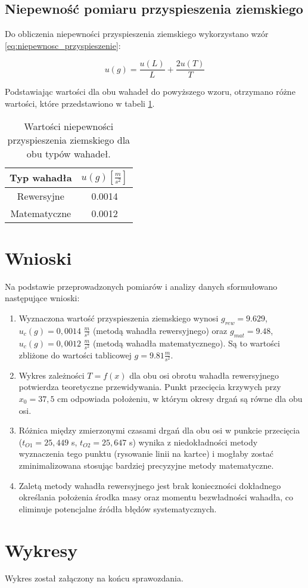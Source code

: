 \documentclass[a4paper,12pt]{article}
\begin{document}
\subsection{Niepewność pomiaru przyspieszenia ziemskiego}

Do obliczenia niepewności przyspieszenia ziemskiego wykorzystano wzór \ref{eq:niepewnosc_przyspieszenie}:

\begin{equation}
  \label{eq:niepewnosc_przyspieszenie}
  u(g) = \frac{u(L)}{L} + \frac{2 u(T)}{T}
\end{equation}

Podstawiając wartości dla obu wahadeł do powyższego wzoru, otrzymano różne wartości, które przedstawiono w tabeli \ref{tab:niepewnosci}.


\begin{table}[H]
  \centering
  \begin{tabular}{|c|c|}
    \hline
    Typ wahadła & $u(g) \left[\frac{m}{s^2}\right]$ \\
    \hline
    Rewersyjne & 0.0014 \\
    \hline
    Matematyczne & 0.0012 \\
    \hline
  \end{tabular}
  \caption{Wartości niepewności przyspieszenia ziemskiego dla obu typów wahadeł.}
  \label{tab:niepewnosci}
\end{table}

\section{Wnioski}


Na podstawie przeprowadzonych pomiarów i analizy danych sformułowano następujące wnioski:

\begin{enumerate}
  \item Wyznaczona wartość przyspieszenia ziemskiego wynosi $g_{rew} = 9.629$, $u_c(g) = 0,0014$ $\frac{m}{s^2}$ (metodą wahadła rewersyjnego) oraz $g_{mat} = 9.48$, $u_c(g)  = 0,0012$ $\frac{m}{s^2}$ (metodą wahadła matematycznego). Są to wartości zbliżone do wartości tablicowej $g = 9.81 \frac{m}{s^2}$.

  \item Wykres zależności $T=f(x)$ dla obu osi obrotu wahadła rewersyjnego potwierdza teoretyczne przewidywania. Punkt przecięcia krzywych przy $x_0 = 37,5$ cm odpowiada położeniu, w którym okresy drgań są równe dla obu osi.

  \item Różnica między zmierzonymi czasami drgań dla obu osi w punkcie przecięcia ($t_{O1} = 25,449$ s, $t_{O2} = 25,647$ s) wynika z niedokładności metody wyznaczenia tego punktu (rysowanie linii na kartce) i mogłaby zostać zminimalizowana stosując bardziej precyzyjne metody matematyczne.

  \item Zaletą metody wahadła rewersyjnego jest brak konieczności dokładnego określania położenia środka masy oraz momentu bezwładności wahadła, co eliminuje potencjalne źródła błędów systematycznych.
\end{enumerate}

\section{Wykresy}

Wykres został załączony na końcu sprawozdania.



\end{document}
